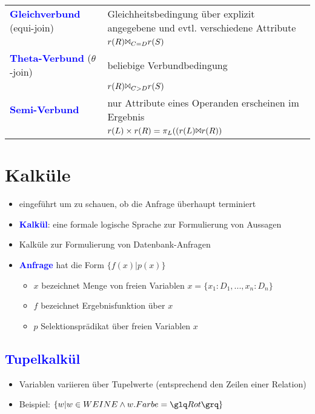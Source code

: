 \documentclass{scrartcl}
\newcommand{\key}[1]{{\textcolor{blue}{\textbf{#1}}}}
\begin{document}
\begin{tabular}{lp{10cm}}
	\key{Gleichverbund} (equi-join) & Gleichheitsbedingung über explizit angegebene und evtl. verschiedene Attribute \\& $r(R) \Bowtie_{C=D} r(S)$ \\
	\key{Theta-Verbund} ($\theta$-join) & beliebige Verbundbedingung \\& $r(R) \Bowtie_{C > D} r(S)$ \\
	\key{Semi-Verbund} & nur Attribute eines Operanden erscheinen im Ergebnis  \\& $r(L) \times r(R) = \pi_L ((r(L) \Bowtie r(R))$ \\
\end{tabular}



\section{Kalküle}

\begin{itemize}
	\itemsep0em
	\item eingeführt um zu schauen, ob die Anfrage überhaupt terminiert
	\item \key{Kalkül}: eine formale logische Sprache zur Formulierung von Aussagen
	\item Kalküle zur Formulierung von Datenbank-Anfragen
	\item \key{Anfrage} hat die Form $ \{f(x) | p(x)\} $
	\begin{itemize}
		\item $x$ bezeichnet Menge von freien Variablen $x = \{x_1 : D_1, . . . , x_n : D_n\}$
		\item $f$ bezeichnet Ergebnisfunktion über $x$
		\item $p$ Selektionsprädikat über freien Variablen $x$
	\end{itemize}
\end{itemize}

\subsection{\key{Tupelkalkül}}

\begin{itemize}
	\itemsep0em
	\item Variablen variieren über Tupelwerte (entsprechend den Zeilen einer Relation)
	\item Beispiel: $\{w | w \in WEINE \wedge w.Farbe = \glq Rot\grq \}$
\end{itemize}
\end{document}
